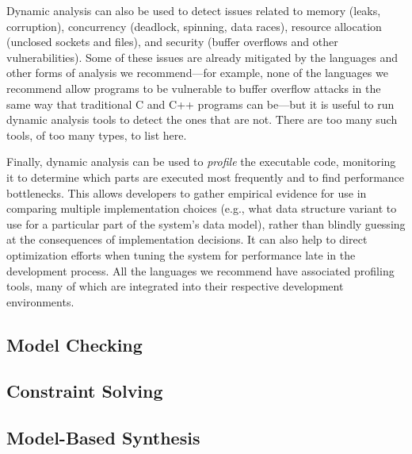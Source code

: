 Dynamic analysis can also be used to detect issues related to memory
(leaks, corruption), concurrency (deadlock, spinning, data races),
resource allocation (unclosed sockets and files), and security (buffer
overflows and other vulnerabilities). Some of these issues are already
mitigated by the languages and other forms of analysis we
recommend---for example, none of the languages we recommend allow
programs to be vulnerable to buffer overflow attacks in the same way
that traditional C and C++ programs can be---but it is useful to run
dynamic analysis tools to detect the ones that are not. There are too
many such tools, of too many types, to list here.

Finally, dynamic analysis can be used to \emph{profile} the executable
code, monitoring it to determine which parts are executed most
frequently and to find performance bottlenecks. This allows developers
to gather empirical evidence for use in comparing multiple
implementation choices (e.g., what data structure variant to use for a
particular part of the system's data model), rather than blindly
guessing at the consequences of implementation decisions. It can also
help to direct optimization efforts when tuning the system for
performance late in the development process. All the languages we
recommend have associated profiling tools, many of which are
integrated into their respective development environments.

\subsection{Model Checking}


\subsection{Constraint Solving}


\subsection{Model-Based Synthesis}


